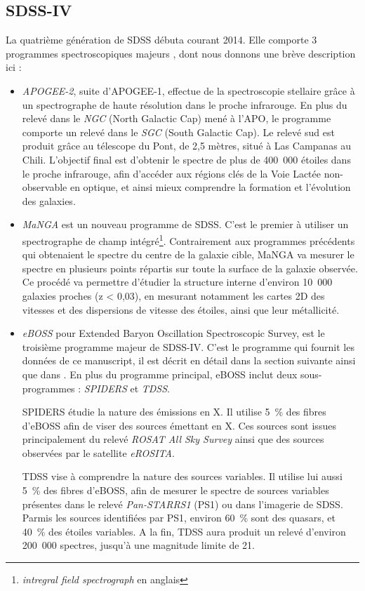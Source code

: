 \documentclass[11pt, twoside, a4paper, openright]{report}
\begin{document}
\subsection{SDSS-IV}

La quatrième génération de SDSS débuta courant 2014. Elle comporte 3 programmes spectroscopiques majeurs \cite{Blanton2017}, dont nous donnons une brève description ici :
\begin{itemize}
\item \emph{APOGEE-2}, suite d'APOGEE-1, effectue de la spectroscopie stellaire grâce à un spectrographe de haute résolution dans le proche infrarouge. En plus du relevé dans le \emph{NGC} (North Galactic Cap) mené à l'APO, le programme comporte un relevé dans le \emph{SGC} (South Galactic Cap). Le relevé sud est produit grâce au télescope du Pont, de 2,5 mètres, situé à Las Campanas au Chili. L'objectif final est d'obtenir le spectre de plus de 400~000 étoiles dans le proche infrarouge, afin d'accéder aux régions clés de la Voie Lactée non-observable en optique, et ainsi mieux comprendre la formation et l'évolution des galaxies.
\item \emph{MaNGA} est un nouveau programme de SDSS. C'est le premier à utiliser un spectrographe de champ intégré\footnote{\emph{intregral field spectrograph} en anglais}. Contrairement aux programmes précédents qui obtenaient le spectre du centre de la galaxie cible, MaNGA va mesurer le spectre en plusieurs points répartis sur toute la surface de la galaxie observée. Ce procédé va permettre d'étudier la structure interne d'environ 10~000 galaxies proches (z < 0,03), en mesurant notamment les cartes 2D des vitesses et des dispersions de vitesse des étoiles, ainsi que leur  métallicité.
\item \emph{eBOSS} pour Extended Baryon Oscillation Spectroscopic Survey, est le troisième programme majeur de SDSS-IV. C'est le programme qui fournit les données de ce manuscript, il est décrit en détail dans la section suivante ainsi que dans \cite{Dawson2015}. En plus du programme principal, eBOSS inclut deux sous-programmes : \emph{SPIDERS} et \emph{TDSS}.
  
  SPIDERS étudie la nature des émissions en X. Il utilise 5~\% des fibres d'eBOSS afin de viser des sources émettant en X. Ces sources sont issues principalement du relevé \emph{ROSAT All Sky Survey} ainsi que des sources observées par le satellite \emph{eROSITA}.

  TDSS vise à comprendre la nature des sources variables. Il utilise lui aussi 5~\% des fibres d'eBOSS, afin de mesurer le spectre de sources variables présentes dans le relevé \emph{Pan-STARRS1} (PS1) ou dans l'imagerie de SDSS. Parmis les sources identifiées par PS1, environ 60~\% sont des quasars, et 40~\% des étoiles variables. A la fin, TDSS aura produit un relevé d'environ 200~000 spectres, jusqu'à une magnitude limite de 21.
\end{itemize}
\end{document}

